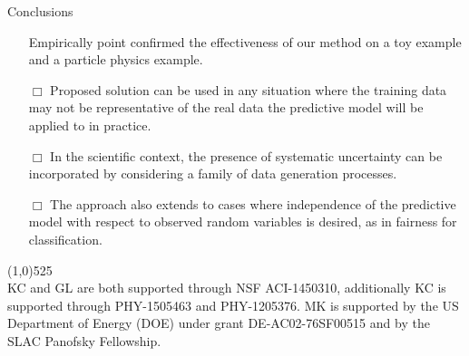 \documentclass[final]{beamer}
\newcommand{\cmark}{\ding{51}}%
\begin{document}
\begin{frame}{}
\begin{textblock}{0.32}
\begin{block}{Conclusions \phantom{p}}
\begin{itemize}
\item[{\color{green} \cmark}]  Empirically point confirmed the effectiveness of our method on a toy example
and a particle physics example.

\end{itemize}

\begin{itemize}
\item[{\color{blue} $\Box$}] Proposed solution can be used in any situation
where the training data may not be representative of the real data the
predictive model will be applied to in practice. 

\item[{\color{blue} $\Box$}] In the scientific context, the
presence of systematic uncertainty can be incorporated by considering a family
of data generation processes. 

\item[{\color{blue} $\Box$}] The approach also extends to cases where independence of the predictive model with respect to
observed random variables is desired, as in fairness for
classification.
\end{itemize}


\line(1,0){525}\\
KC and GL are both supported through NSF ACI-1450310, additionally KC is supported through PHY-1505463 and PHY-1205376. MK is supported by the US Department of Energy (DOE) under grant DE-AC02-76SF00515 and by the SLAC Panofsky Fellowship. 
\end{block}




\end{textblock}




\end{frame}
\end{document}
